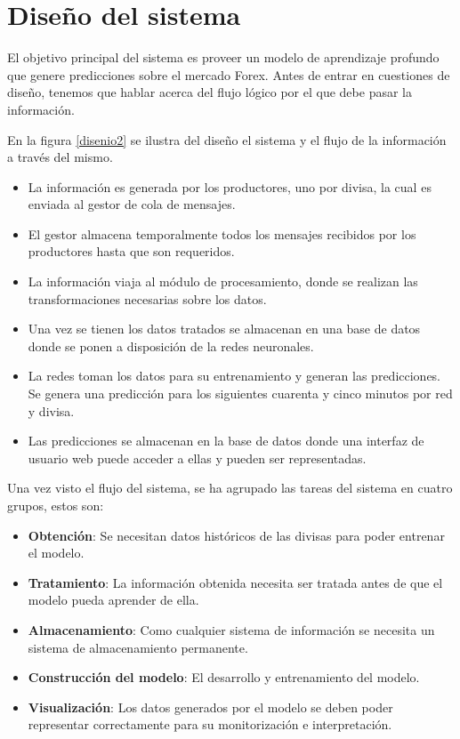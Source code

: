 
\chapter{Diseño del sistema}\label{cap4}

El objetivo principal del sistema es proveer un modelo de aprendizaje profundo que genere predicciones sobre el mercado Forex. Antes de entrar en cuestiones de diseño, tenemos que hablar acerca del flujo lógico por el que debe pasar la información.


En la figura \ref{disenio2} se ilustra del diseño el sistema y el flujo de la información a través del mismo.
\begin{itemize}
\item La información es generada por los productores, uno por divisa, la cual es enviada al gestor de cola de mensajes. 
\item El gestor almacena temporalmente todos los mensajes recibidos por los productores hasta que son requeridos. 
\item La información viaja al módulo de procesamiento, donde se realizan las transformaciones necesarias sobre los datos. 
\item Una vez se tienen los datos tratados se almacenan en una base de datos donde se ponen a disposición de la redes neuronales. 
\item La redes toman los datos para su entrenamiento y generan las predicciones. Se genera una predicción para los siguientes cuarenta y cinco minutos por red y divisa. 
\item Las predicciones se almacenan en la base de datos donde una interfaz de usuario web puede acceder a ellas y pueden ser representadas.
\end{itemize}


\pagebreak


Una vez visto el flujo del sistema, se ha agrupado las tareas del sistema en cuatro grupos, estos son: 
\begin{itemize}
\item \textbf{Obtención}: Se necesitan datos históricos de las divisas para poder entrenar el modelo.
\item \textbf{Tratamiento}: La información obtenida necesita ser tratada antes de que el modelo pueda aprender de ella.
\item \textbf{Almacenamiento}: Como cualquier sistema de información se necesita un sistema de almacenamiento permanente.
\item \textbf{Construcción del modelo}: El desarrollo y entrenamiento del modelo.
\item \textbf{Visualización}: Los datos generados por el modelo se deben poder representar correctamente para su monitorización e interpretación.
\end{itemize}


